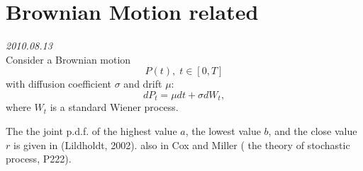 \chapter{Brownian Motion related}
\textit{2010.08.13}\\
Consider a Brownian motion
\[ P(t),\; t\in[0,T] \]
with diffusion coefficient $ \sigma $ and drift $ \mu $:
\[ dP_t=\mu d t+\sigma d W_t,\]
where $W_t$ is a standard Wiener process.

The the joint p.d.f. of the highest value $a$, the lowest value $b$, and the close value $r$ is given in (Lildholdt, 2002).
also in Cox and Miller ( the theory of stochastic process, P222).

